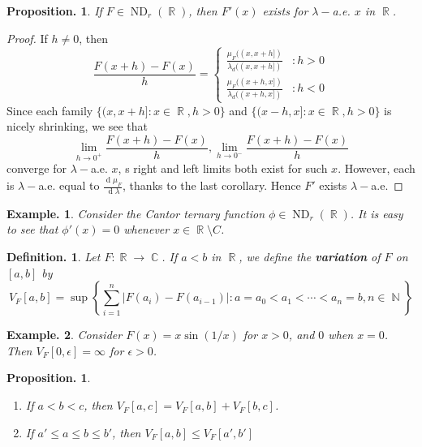 \documentclass[11pt, a4paper]{memoir}
\DeclareMathOperator{\N}{{\mathbb{N}}}
\DeclareMathOperator{\R}{{\mathbb{R}}}
\DeclareMathOperator{\C}{{\mathbb{C}}}
\theoremstyle{change}
\newtheorem{proposition}[theorem]{Proposition.}
\theoremstyle{plain}
\theoremstyle{nonumberplain}
\newtheorem{definition}{Definition.}
\newtheorem{example}{Example.}
\newtheorem{proof}{Proof}
\renewcommand{\d}[1]{\ensuremath{\operatorname{d}\!{#1}}}
\DeclareMathOperator{\ND}{ND}
\numberwithin{equation}{section}
\begin{document}
\begin{proposition}
    If $F\in\ND_r(\R)$, then $F'(x)$ exists for $\lambda-$a.e. $x$ in $\R$.
\end{proposition}
\begin{proof}
    If $h\neq 0$, then
    \begin{equation*}
        \frac{F(x+h)-F(x)}{h}=
        \begin{cases}
            \frac{\mu_F((x,x+h])}{\lambda_d((x,x+h])}&:h>0\\
            \frac{\mu_F((x+h,x])}{\lambda_d((x+h,x])}&:h<0
        \end{cases}
    \end{equation*}
    Since each family $\{(x,x+h]:x\in\R,h>0\}$ and $\{(x-h,x]:x\in\R,h>0\}$ is nicely shrinking, we see that
    \begin{equation*}
        \lim_{h\to 0^+}\frac{F(x+h)-F(x)}{h},\lim_{h\to 0^-}\frac{F(x+h)-F(x)}{h}
    \end{equation*}
    converge for $\lambda-$a.e. $x$, s right and left limits both exist for such $x$.
    However, each is $\lambda-$a.e. equal to $\frac{\d{\mu_F}}{\d{\lambda}}$, thanks to the last corollary.
    Hence $F'$ exists $\lambda-$a.e.
\end{proof}
\begin{example}
    Consider the Cantor ternary function $\phi\in\ND_r(\R)$.
    It is easy to see that $\phi'(x)=0$ whenever $x\in\R\setminus C$.
\end{example}
\begin{definition}
    Let $F:\R\to\C$.
    If $a<b$ in $\R$, we define the \textbf{variation} of $F$ on $[a,b]$ by
    \begin{equation*}
        V_F[a,b]=\sup\left\{\sum_{i=1}^n|F(a_i)-F(a_{i-1})|:a=a_0<a_1<\cdots<a_n=b,n\in\N\right\}
    \end{equation*}
\end{definition}
\begin{example}
    Consider $F(x)=x\sin(1/x)$ for $x>0$, and $0$ when $x=0$.
    Then $V_F[0,\epsilon]=\infty$ for $\epsilon>0$.
\end{example}
\begin{proposition}
    \begin{enumerate}[nl,r]
        \item If $a<b<c$, then $V_F[a,c]=V_F[a,b]+V_F[b,c]$.
        \item If $a'\leq a\leq b\leq b'$, then $V_F[a,b]\leq V_F[a',b']$
    \end{enumerate}
\end{proposition}
\end{document}

